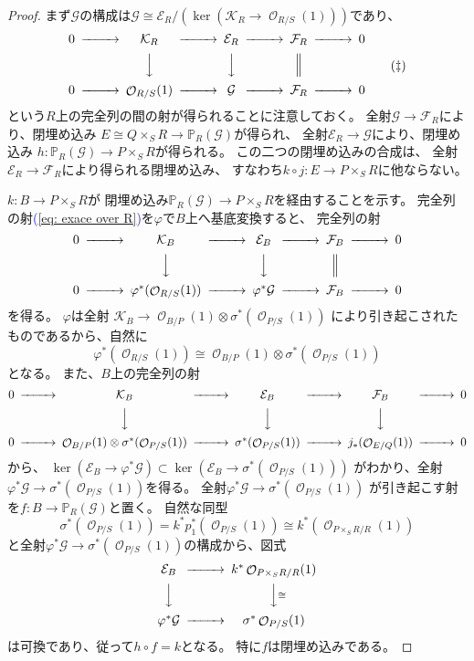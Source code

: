 \documentclass[uplatex]{jsarticle}
\renewcommand{\eqref}[1]{\textcolor{blue}{(\ref{#1})}}
\theoremstyle{definition}
\renewcommand{\P}{\mathbb{P}}
\newcommand{\mcE}{\mathcal{E}}
\newcommand{\mcF}{\mathcal{F}}
\newcommand{\mcG}{\mathcal{G}}
\newcommand{\mcK}{\mathcal{K}}
\newcommand{\mcO}{\mathcal{O}}
\DeclareMathOperator{\OOO}{\mcO}
\newcommand{\OO}[1]{\OOO_{#1}}
\begin{document}
\begin{proof}
  まず\(\mcG\)の構成は\(\mcG\cong \mcE_R/(\ker (\mcK_R\to \OO{R/S}(1)))\)であり、
  \begin{equation}\label{eq: exace over R}
    \begin{CD}
      0 @>>> \mcK_R @>>> \mcE_R @>>> \mcF_R @>>> 0 \\
      @. @VVV @VVV @| @.\\
      0 @>>> \OO{R/S}(1) @>>> \mcG @>>> \mcF_R @>>> 0
    \end{CD}
    \tag{\(\ddagger\)}
  \end{equation}
  という\(R\)上の完全列の間の射が得られることに注意しておく。
  全射\(\mcG\to \mcF_R\)により、閉埋め込み
  \(E\cong Q\times_SR\to \P_R(\mcG)\)が得られ、
  全射\(\mcE_R\to \mcG\)により、閉埋め込み
  \(h:\P_R(\mcG)\to P\times_SR\)が得られる。
  この二つの閉埋め込みの合成は、
  全射\(\mcE_R\to \mcF_R\)により得られる閉埋め込み、
  すなわち\(k\circ j:E\to P\times_SR\)に他ならない。

  \(k:B\to P\times_SR\)が
  閉埋め込み\(\P_R(\mcG)\to P\times_SR\)を経由することを示す。
  完全列の射\eqref{eq: exace over R}を\(\varphi\)で\(B\)上へ基底変換すると、
  完全列の射
  \[
  \begin{CD}
    0 @>>> \mcK_B @>>> \mcE_B @>>> \mcF_B @>>> 0 \\
    @. @VVV @VVV @| @. \\
    0 @>>> \varphi^*(\OO{R/S}(1)) @>>> \varphi^*\mcG @>>> \mcF_B @>>> 0
  \end{CD}
  \]
  を得る。
  \(\varphi\)は全射
  \(\mcK_B\to \OO{B/P}(1)\otimes \sigma^*(\OO{P/S}(1))\)
  により引き起こされたものであるから、自然に
  \[\varphi^*(\OO{R/S}(1))\cong \OO{B/P}(1)\otimes \sigma^*(\OO{P/S}(1))\]
  となる。
  また、\(B\)上の完全列の射
  \[
  \begin{CD}
    0 @>>> \mcK_B @>>> \mcE_B @>>> \mcF_B @>>> 0 \\
    @. @VVV @VVV @VVV @.\\
    0 @>>> \OO{B/P}(1)\otimes \sigma^*(\OO{P/S}(1)) @>>>
    \sigma^*(\OO{P/S}(1)) @>>> j_*(\OO{E/Q}(1)) @>>> 0
  \end{CD}
  \]
  から、
  \(\ker(\mcE_B\to \varphi^*\mcG)\subset
  \ker(\mcE_B\to \sigma^*(\OO{P/S}(1)))\)
  がわかり、全射\(\varphi^*\mcG\to \sigma^*(\OO{P/S}(1))\)を得る。
  全射\(\varphi^*\mcG\to \sigma^*(\OO{P/S}(1))\)
  が引き起こす射を\(f:B\to \P_R(\mcG)\)と置く。
  自然な同型
  \[\sigma^*(\OO{P/S}(1)) = k^*p_1^*(\OO{P/S}(1))
  \cong k^*(\OO{P\times_SR/R}(1))\]
  と全射\(\varphi^*\mcG\to \sigma^*(\OO{P/S}(1))\)の構成から、図式
  \[
  \begin{CD}
    \mcE_B @>>> k^*\OO{P\times_SR/R}(1) \\
    @VVV @VV\cong V \\
    \varphi^*\mcG @>>> \sigma^*\OO{P/S}(1)
  \end{CD}
  \]
  は可換であり、従って\(h\circ f = k\)となる。
  特に\(f\)は閉埋め込みである。


\end{proof}
\end{document}
